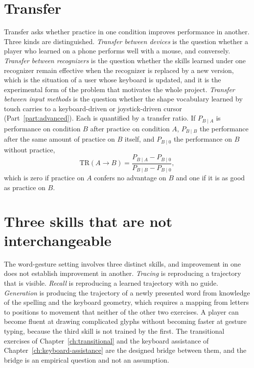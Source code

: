 \section{Transfer}

Transfer asks whether practice in one condition improves performance in another. Three kinds are distinguished. \emph{Transfer between devices} is the question whether a player who learned on a phone performs well with a mouse, and conversely. \emph{Transfer between recognizers} is the question whether the skills learned under one recognizer remain effective when the recognizer is replaced by a new version, which is the situation of a user whose keyboard is updated, and it is the experimental form of the problem that motivates the whole project. \emph{Transfer between input methods} is the question whether the shape vocabulary learned by touch carries to a keyboard-driven or joystick-driven cursor (Part~\ref{part:advanced}). Each is quantified by a transfer ratio. If $P_{B\mid A}$ is performance on condition $B$ after practice on condition $A$, $P_{B\mid B}$ the performance after the same amount of practice on $B$ itself, and $P_{B\mid 0}$ the performance on $B$ without practice,
\[
\mathrm{TR}(A\to B)=\frac{P_{B\mid A}-P_{B\mid 0}}{P_{B\mid B}-P_{B\mid 0}},
\]
which is zero if practice on $A$ confers no advantage on $B$ and one if it is as good as practice on $B$.

\section{Three skills that are not interchangeable}

The word-gesture setting involves three distinct skills, and improvement in one does not establish improvement in another. \emph{Tracing} is reproducing a trajectory that is visible. \emph{Recall} is reproducing a learned trajectory with no guide. \emph{Generation} is producing the trajectory of a newly presented word from knowledge of the spelling and the keyboard geometry, which requires a mapping from letters to positions to movement that neither of the other two exercises. A player can become fluent at drawing complicated glyphs without becoming faster at gesture typing, because the third skill is not trained by the first. The transitional exercises of Chapter~\ref{ch:transitional} and the keyboard assistance of Chapter~\ref{ch:keyboard-assistance} are the designed bridge between them, and the bridge is an empirical question and not an assumption.

